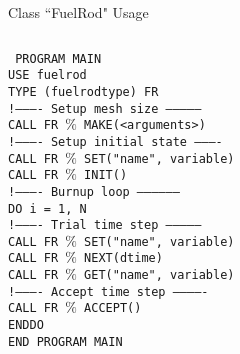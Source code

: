 \documentclass[11pt]{beamer}
\begin{document}
\begin{frame}{Class ``FuelRod" Usage}
  \footnotesize
  \begin{columns}
  \begin{block}{}
    \texttt{
    {\color{magenta}PROGRAM} MAIN\\
    {\color{magenta}USE} fuelrod\\
    {\color{magenta}TYPE} (fuelrodtype) FR\\    
    {\color{gray}!---------- Setup mesh size --------------}\\
    {\color{magenta}CALL} FR $\%$ MAKE(<arguments>)\\
    {\color{gray}!---------- Setup initial state ----------}\\    
    {\color{magenta}CALL} FR $\%$ SET({\color{orange}"name"}, variable)\\
    {\color{magenta}CALL} FR $\%$ INIT()\\
    {\color{gray}!---------- Burnup loop ------------------}\\        
    {\color{magenta}DO} i = 1, N\\
    {\color{gray}!---------- Trial time step --------------}\\            
    {\hspace{5mm}\color{magenta}CALL} FR $\%$ SET({\color{orange}"name"}, variable)\\
    {\hspace{5mm}\color{magenta}CALL} FR $\%$ NEXT(dtime)\\
    {\hspace{5mm}\color{magenta}CALL} FR $\%$ GET({\color{orange}"name"}, variable)\\
    {\color{gray}!---------- Accept time step -------------}\\                
    {\hspace{5mm}\color{magenta}CALL} FR $\%$ ACCEPT()\\    
    {\color{magenta}ENDDO} \\
    {\color{magenta}END PROGRAM}  MAIN
    }        
  \end{block}
  \end{columns}
\end{frame}
\end{document}
